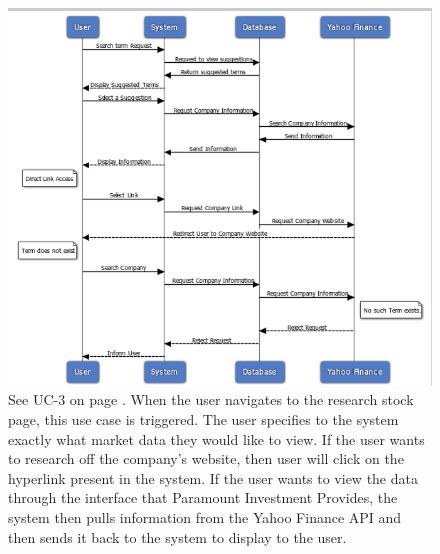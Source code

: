 \begin{figure}[H]
\centering
\includegraphics[width=5.5in]{./img/uc3.png}
\caption{See UC-3 on page \pageref{UC-3}. When the user navigates to the research
stock page, this use case is triggered. The
user specifies to the system exactly what market data they would like to view. If
the user wants to research off the company’s website, then user will click on the
hyperlink present in the system. If the user wants to view the data through the
interface that Paramount Investment Provides, the system then pulls information
from the Yahoo Finance API and then sends it back to the system to display to the
user.}
\end{figure}

